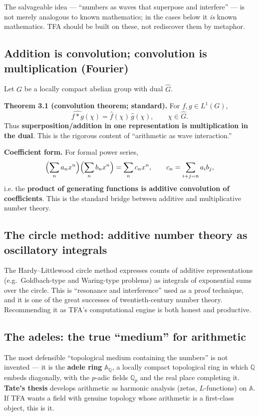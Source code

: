 \documentclass[11pt]{article}
\begin{document}
The salvageable idea --- ``numbers as waves that superpose and interfere'' --- is
not merely analogous to known mathematics; in the cases below it \emph{is} known
mathematics. TFA should be built on these, not rediscover them by metaphor.

\subsection{Addition is convolution; convolution is multiplication (Fourier)}

Let $G$ be a locally compact abelian group with dual $\hat{G}$.

\noindent\textbf{Theorem 3.1 (convolution theorem; standard).} For
$f,g\in L^1(G)$,
\[
\widehat{f*g}(\chi) = \hat f(\chi)\,\hat g(\chi), \qquad \chi\in\hat G .
\]
Thus \textbf{superposition/addition in one representation is multiplication in the
dual}. This is the rigorous content of ``arithmetic as wave interaction.''

\noindent\textbf{Coefficient form.} For formal power series,
\[
\Bigl(\sum_n a_n x^n\Bigr)\Bigl(\sum_n b_n x^n\Bigr)
= \sum_n c_n x^n, \qquad c_n=\sum_{i+j=n}a_i b_j ,
\]
i.e. the \textbf{product of generating functions is additive convolution of
coefficients}. This is the standard bridge between additive and multiplicative
number theory.

\subsection{The circle method: additive number theory as oscillatory integrals}

The Hardy--Littlewood circle method expresses counts of additive representations
(e.g.\ Goldbach-type and Waring-type problems) as integrals of exponential sums
over the circle. This is ``resonance and interference'' used as a proof technique,
and it is one of the great successes of twentieth-century number theory.
Recommending it as TFA's computational engine is both honest and productive.

\subsection{The adeles: the true ``medium'' for arithmetic}

The most defensible ``topological medium containing the numbers'' is not
invented --- it is the \textbf{adele ring} $\mathbb{A}_{\mathbb{Q}}$, a locally
compact topological ring in which $\mathbb{Q}$ embeds diagonally, with the
$p$-adic fields $\mathbb{Q}_p$ and the real place completing it. \textbf{Tate's
thesis} develops arithmetic as harmonic analysis (zetas, $L$-functions) on
$\mathbb{A}$. If TFA wants a field with genuine topology whose arithmetic is a
first-class object, this is it.
\end{document}
